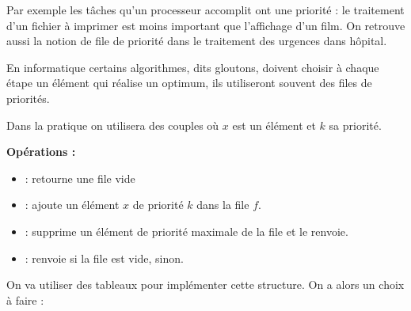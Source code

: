 Par exemple les tâches qu'un processeur accomplit ont une priorité : le traitement d'un fichier à imprimer est moins important que l'affichage d'un film. On retrouve aussi la notion de file de priorité dans le traitement des urgences dans hôpital.

En informatique certains algorithmes, dits gloutons, doivent choisir à chaque étape un élément qui réalise un optimum, ils utiliseront souvent des files de priorités.
\begin{center}
\end{center}
Dans la pratique on utilisera des couples  où $x$ est un élément et $k$ sa priorité.

{\bf Opérations :}
\begin{itemize}
\item {} : retourne une file vide 
\item {} : ajoute un élément $x$ de priorité $k$ dans la file $f$.
\item {} : supprime un élément de priorité maximale de la file et le renvoie.
\item {} : renvoie  si la file est vide,  sinon.
 \end{itemize}

On va utiliser des tableaux pour implémenter cette structure. On a alors un choix à faire : 

